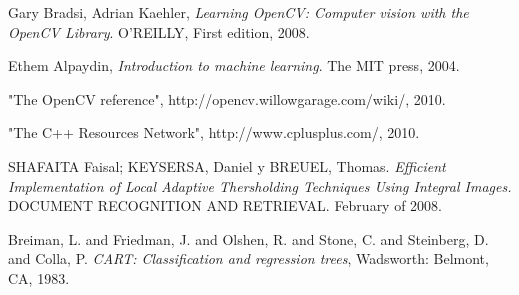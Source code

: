 \documentclass[10pt,journal]{IEEEtran}
\begin{document}
	\begin{thebibliography}{9}
	
			Gary Bradsi, Adrian Kaehler,
			\emph{Learning OpenCV: Computer vision with the OpenCV Library}.
			O'REILLY,
			First edition,
			2008.
			
			Ethem Alpaydin,
			\emph{Introduction to machine learning}.
			The MIT press,
			2004.
		
			"The OpenCV reference",
			http://opencv.willowgarage.com/wiki/,
			2010.
			
			"The C++ Resources Network",
			http://www.cplusplus.com/,
			2010.
			
			SHAFAITA Faisal; KEYSERSA, Daniel y BREUEL, Thomas. 
			\emph{Efficient Implementation of Local Adaptive Thersholding Techniques Using Integral Images.}
			DOCUMENT RECOGNITION AND RETRIEVAL. 
			February of 2008.
			
			Breiman, L. and Friedman, J. and Olshen, R. and Stone, C. and Steinberg, D. and Colla, P.
			\emph{CART: Classification and regression trees},
			Wadsworth: Belmont, CA,
			1983.
	\end{thebibliography}
	
\end{document}
